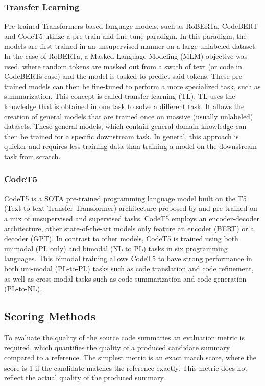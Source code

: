 \subsubsection{Transfer Learning}
Pre-trained Transformers-based language models, such as RoBERTa, CodeBERT \cite{CodeBERT} and CodeT5 \cite{CodeT5} utilize a pre-train and fine-tune paradigm. In this paradigm, the models are first trained in an unsupervised manner on a large unlabeled dataset. In the case of RoBERTa, a Masked Language Modeling (MLM) objective was used, where random tokens are masked out from a swath of text (or code in CodeBERTs case) and the model is tasked to predict said tokens. These pre-trained models can then be fine-tuned to perform a more specialized task, such as summarization. This concept is called transfer learning (TL). 
TL uses the knowledge that is obtained in one task to solve a different task. It allows the creation of general models that are trained once on massive (usually unlabeled) datasets. These general models, which contain general domain knowledge can then be trained for a specific downstream task. In general, this approach is quicker and requires less training data than training a model on the downstream task from scratch\cite{BERT}.

\subsubsection{CodeT5}
CodeT5 is a SOTA pre-trained programming language model built on the T5 (Text-to-text Transfer Transformer) architecture proposed by \citeauthor{CodeT5} and pre-trained on a mix of unsupervised and supervised tasks. CodeT5 employs an encoder-decoder architecture, other state-of-the-art models only feature an encoder (BERT) or a decoder (GPT).
In contrast to other models, CodeT5 is trained using both unimodal (PL only) and bimodal (NL to PL) tasks in six programming languages. This bimodal training allows CodeT5 to have strong performance in both uni-modal (PL-to-PL) tasks such as code translation and code refinement, as well as cross-modal tasks such as code summarization and code generation (PL-to-NL).

\subsection{Scoring Methods}
To evaluate the quality of the source code summaries an evaluation metric is required, which quantifies the quality of a produced candidate summary compared to a reference. The simplest metric is an exact match score, where the score is 1 if the candidate matches the reference exactly. This metric does not reflect the actual quality of the produced summary.

